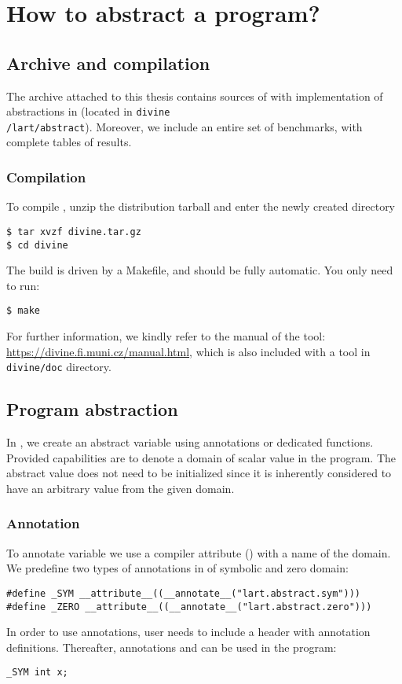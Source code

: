 \chapter{How to abstract a program?}\label{ch:appendixb}

\section{Archive and compilation}

The archive attached to this thesis contains sources of \DIVINE with
implementation of abstractions in \LART (located in
\texttt{divine\\/lart/abstract}).
Moreover, we include an entire set of benchmarks, with complete tables of results.

\subsection{Compilation}
To compile \DIVINE, unzip the distribution tarball and enter the
newly created directory
\begin{verbatim}
$ tar xvzf divine.tar.gz
$ cd divine
\end{verbatim}
The build is driven by a Makefile, and should be fully automatic. You only need to run:
\begin{verbatim}
$ make
\end{verbatim}
For further information, we kindly refer to the manual of the tool:
\url{https://divine.fi.muni.cz/manual.html}, which is also inclu\-ded with a tool
in \texttt{divine/doc} directory.

\section{Program abstraction}
In \DIVINE, we create an abstract variable using annotations or dedicated
functions. Provided capabilities are to denote a domain of scalar value in the
program. The abstract value does not need to be initialized since it is
inherently considered to have an arbitrary value from the given domain.

\subsection{Annotation}

To annotate variable we use a compiler attribute () with
a name of the domain. We predefine two types of annotations in
 of symbolic and zero domain:
\begin{verbatim}
#define _SYM __attribute__((__annotate__("lart.abstract.sym")))
#define _ZERO __attribute__((__annotate__("lart.abstract.zero")))
\end{verbatim}
In order to use annotations, user needs to include a header with annotation
definitions. Thereafter, annotations  and  can be used in
the program:
\begin{verbatim}
_SYM int x;
\end{verbatim}

